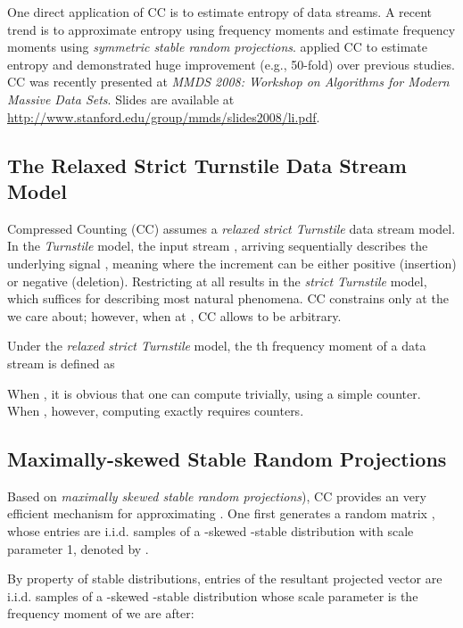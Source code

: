 \documentclass[oneside,10pt]{article}
\begin{document}
One direct application of CC is to estimate entropy of data streams. A recent trend is to approximate entropy using frequency moments and estimate frequency moments using {\em symmetric stable random projections}\cite{Proc:Zhao_IMC07,Proc:Harvey_FOCS08}.  \cite{Report:Li_CC_entropy} applied CC to estimate entropy and demonstrated huge improvement (e.g., 50-fold) over previous studies.\\



CC was recently presented at {\em  MMDS 2008: Workshop on Algorithms for Modern Massive Data Sets}. Slides are available at \url{http://www.stanford.edu/group/mmds/slides2008/li.pdf}.


\subsection{The Relaxed Strict Turnstile Data Stream Model }

Compressed Counting (CC) assumes a {\em relaxed strict Turnstile} data stream model. In the {\em Turnstile} model\cite{Article:Muthukrishnan_05}, the input  stream ,  arriving sequentially describes the underlying signal , meaning
 where the increment  can be either positive (insertion) or negative (deletion). Restricting   at all    results in the {\em strict Turnstile} model, which suffices for describing most natural phenomena. CC constrains  only at the  we care about; however, when at , CC allows  to be arbitrary.

Under the {\em relaxed strict Turnstile} model, the th frequency moment of a data stream  is defined as

When , it is obvious that one can compute  trivially, using a simple counter.  When , however, computing  exactly requires  counters.

\subsection{Maximally-skewed Stable Random Projections}

Based on {\em maximally skewed stable random projections}), CC provides an very efficient mechanism for approximating .  One first generates a random matrix , whose entries are i.i.d. samples of a -skewed -stable distribution with scale parameter 1, denoted by .

By property of stable distributions\cite{Book:Zolotarev_86,Book:Samorodnitsky_94}, entries of the resultant projected vector  are i.i.d. samples of a -skewed -stable distribution whose scale parameter is the  frequency moment of  we are after:
\end{document}
